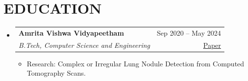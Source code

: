 \documentclass[letterpaper,11pt]{article}
\makeatletter
\newcommand{\resumeItem}[1]{
\item\small{
    {#1 \vspace{0pt}}
  }
}
\newcommand{\resumeSubheading}[4]{
  \vspace{2pt}
\item
  \begin{tabular*}{\textwidth}[t]{l@{\extracolsep{\fill}}r}
    \textbf{#1} & {\color{dark-grey}\small #2}\vspace{0pt}\\
    \textit{#3} & {\color{dark-grey} \small #4}\\
  \end{tabular*}\vspace{-2pt}
}
\newcommand{\resumeSubHeadingListStart}{
\begin{itemize}[leftmargin=0in, label={}]}
\newcommand{\resumeSubHeadingListEnd}{
  \end{itemize}\vspace{-2pt}}
\newcommand{\resumeItemListStart}{
\begin{itemize}[leftmargin=0.15in, itemsep=2pt, parsep=0pt, topsep=1pt]}
\newcommand{\resumeItemListEnd}{
  \end{itemize}\vspace{-1pt}}
\makeatother
\begin{document}
\vspace{-8pt}
\section{EDUCATION}
\resumeSubHeadingListStart
\resumeSubheading
{Amrita Vishwa Vidyapeetham}{Sep 2020 -- May 2024}
{B.Tech, Computer Science and Engineering}{\href{https://doi.org/10.1007/978-3-031-99939-0_4}{Paper}}
\resumeItemListStart
\resumeItem{Research: Complex or Irregular Lung Nodule Detection from Computed Tomography Scans.}
\resumeItemListEnd
\resumeSubHeadingListEnd
\end{document}
